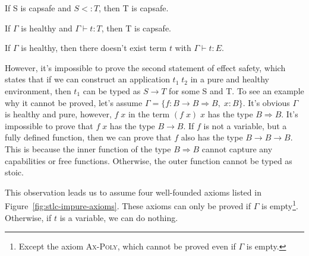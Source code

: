 \begin{lemma}
 If S is capsafe and $S <: T$, then T is capsafe.
\end{lemma}

\begin{lemma}
  If $\Gamma$ is healthy and $\Gamma \vdash t : T$, then T is capsafe.
\end{lemma}

\begin{theorem}
  If $\Gamma$ is healthy, then there doesn't exist term $t$ with
  $\Gamma \vdash t : E$.
\end{theorem}

However, it's impossible to prove the second statement of effect
safety, which states that if we can construct an application
$t_1 \; t_2$ in a pure and healthy environment, then $t_1$ can be
typed as $S \to T$ for some S and T. To see an example why it cannot
be proved, let's assume
$\Gamma = \{f: B \to B \Rightarrow B, \; x: B\}$. It's obvious
$\Gamma$ is healthy and pure, however, $f \; x$ in the term
$(f \; x) \;x$ has the type $B \Rightarrow B$. It's impossible to
prove that $f \; x$ has the type $B \to B$. If $f$ is not a variable,
but a fully defined function, then we can prove that $f$ also has the
type $B \to B \to B$. This is because the inner function of the type
$B \Rightarrow B$ cannot capture any capabilities or free functions.
Otherwise, the outer function cannot be typed as stoic.

This observation leads us to assume four well-founded axioms listed in
Figure~\ref{fig:stlc-impure-axioms}. These axioms can only be proved
if $\Gamma$ is empty\footnote{Except the axiom \textsc{Ax-Poly}, which
  cannot be proved even if $\Gamma$ is empty.}. Otherwise, if $t$ is a
variable, we can do nothing.

